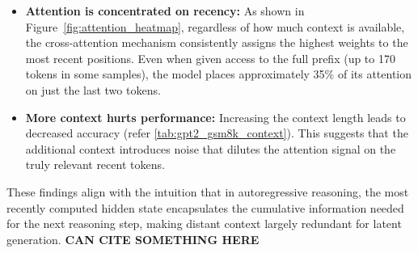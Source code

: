 
\begin{itemize}
    \item \textbf{Attention is concentrated on recency:} As shown in Figure~\ref{fig:attention_heatmap}, regardless of how much context is available, the cross-attention mechanism consistently assigns the highest weights to the most recent positions. Even when given access to the full prefix (up to 170 tokens in some samples), the model places approximately 35\% of its attention on just the last two tokens.

    \item \textbf{More context hurts performance:} Increasing the context length leads to decreased accuracy (refer \ref{tab:gpt2_gsm8k_context}). This suggests that the additional context introduces noise that dilutes the attention signal on the truly relevant recent tokens.
\end{itemize}


These findings align with the intuition that in autoregressive reasoning, the most recently computed hidden state encapsulates the cumulative information needed for the next reasoning step, making distant context largely redundant for latent generation. \large\textbf{CAN CITE SOMETHING HERE}


